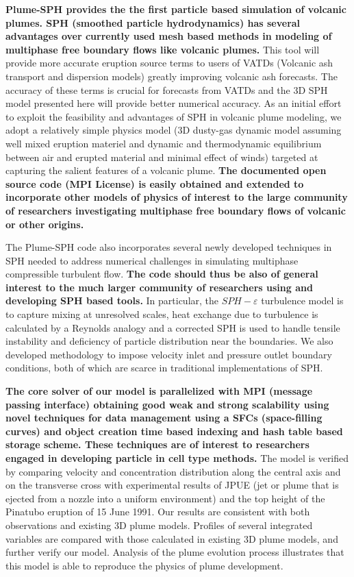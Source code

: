 \documentclass[11pt]{article}
\begin{document}
{\bf  Plume-SPH provides the the first particle based simulation of volcanic plumes.  SPH (smoothed particle hydrodynamics) has several advantages over currently used mesh based methods in modeling of multiphase free boundary flows like volcanic plumes. }This tool will provide more accurate eruption source terms to users of VATDs (Volcanic ash transport and dispersion models) greatly improving volcanic ash forecasts.  The accuracy of these terms is crucial for forecasts from VATDs and the 3D SPH model presented here will provide better numerical accuracy. As an initial effort to exploit the feasibility and advantages of SPH in volcanic plume modeling, we adopt a relatively simple physics model  (3D dusty-gas dynamic model assuming well mixed eruption materiel and dynamic and thermodynamic equilibrium between air and erupted material and minimal effect of winds) targeted at capturing the salient features of a volcanic plume.  {\bf The documented open source code (MPI License)  is easily obtained and extended to incorporate other models of physics of interest to the large community of researchers investigating multiphase free boundary flows of volcanic or other origins. }

The Plume-SPH code also incorporates  several newly developed techniques in SPH  needed to address numerical challenges in simulating multiphase compressible turbulent flow.  {\bf The code should thus be also of general interest to the much larger community of researchers using and developing SPH based tools.} In particular, the $SPH-\varepsilon$ turbulence model is to capture mixing at unresolved scales, heat exchange due to turbulence is calculated by a Reynolds analogy and a corrected SPH is used to handle tensile instability and deficiency of particle distribution near the boundaries. We also developed methodology to impose velocity inlet and pressure outlet boundary conditions, both of which are scarce in traditional implementations of SPH. 

{\bf The core solver of our model is parallelized with MPI (message passing interface) obtaining good weak and strong scalability using novel techniques for data management using a SFCs (space-filling curves) and object creation time based indexing and hash table based storage scheme. These techniques are of  interest to  researchers engaged in developing particle in cell type methods. } The model is verified by comparing velocity and concentration distribution along the central axis and on the transverse cross with experimental results of JPUE (jet or plume that is ejected from a nozzle into a uniform environment) and the top height of the Pinatubo eruption of 15 June 1991. Our results are consistent with both observations and existing 3D plume models. Profiles of several integrated variables are compared with those calculated in existing 3D plume models, and further verify our model. Analysis of the plume evolution process illustrates that this model is able to reproduce the physics of plume development. 
\end{document}
